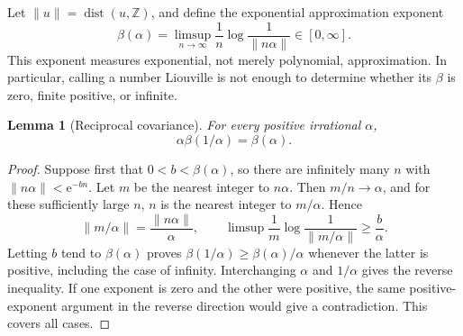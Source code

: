 \documentclass[11pt,a4paper]{article}
\numberwithin{equation}{section}
\newtheorem{lemma}[theorem]{Lemma}
\theoremstyle{definition}
\theoremstyle{remark}
\newcommand{\e}{\mathrm e}
\newcommand{\dist}{\operatorname{dist}}
\newcommand{\Z}{\mathbb Z}
\begin{document}
Let $\|u\|=\dist(u,\Z)$, and define the exponential approximation exponent
\begin{equation}
 \beta(\alpha)=\limsup_{n\to\infty}\frac1n\log\frac1{\|n\alpha\|}
 \in[0,\infty].
 \label{eq:beta}
\end{equation}
This exponent measures exponential, not merely polynomial,
approximation. In particular, calling a number Liouville is not enough
to determine whether its $\beta$ is zero, finite positive, or infinite.

\begin{lemma}[Reciprocal covariance]
\label{lem:reciprocal}
For every positive irrational $\alpha$,
\begin{equation}
 \alpha\beta(1/\alpha)=\beta(\alpha).
 \label{eq:beta-reciprocal}
\end{equation}
\end{lemma}
\begin{proof}
Suppose first that $0<b<\beta(\alpha)$, so there are infinitely many $n$
with $\|n\alpha\|<\e^{-bn}$. Let $m$ be the nearest integer to
$n\alpha$. Then $m/n\to\alpha$, and for these sufficiently large $n$,
$n$ is the nearest integer to $m/\alpha$. Hence
\[
 \|m/\alpha\|=\frac{\|n\alpha\|}{\alpha},\qquad
 \limsup\frac1m\log\frac1{\|m/\alpha\|}\ge\frac b\alpha.
\]
Letting $b$ tend to $\beta(\alpha)$ proves
$\beta(1/\alpha)\ge\beta(\alpha)/\alpha$ whenever the latter is positive,
including the case of infinity. Interchanging $\alpha$ and $1/\alpha$
gives the reverse inequality. If one exponent is zero and the other were
positive, the same positive-exponent argument in the reverse direction
would give a contradiction. This covers all cases.
\end{proof}
\end{document}
